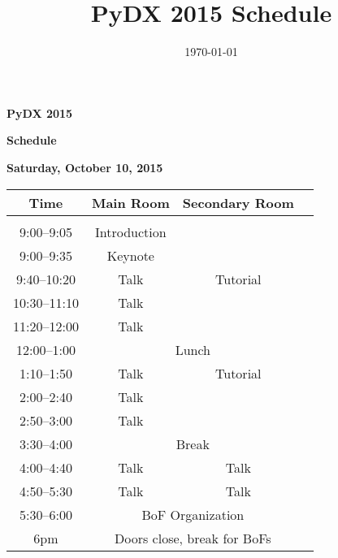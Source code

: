 \documentclass[letterpaper]{article}
\title{PyDX 2015 Schedule}
\date{\today}
\def\vsep{9pt}
\begin{document}
\Large

\centerline{\LARGE\bf PyDX 2015}
\vskip 10pt
\centerline{\LARGE\bf Schedule}

\vskip 1in

\begin{center}
\textbf{Saturday, October 10, 2015}\vskip0.25in
\begin{tabular}{cccc}
  \toprule
  Time & Main Room & Secondary Room \\
  \midrule\\[0pt]
  9:00--9:05 & Introduction & \\[\vsep]
  9:00--9:35 & Keynote & \\[\vsep]
  \midrule
  9:40--10:20 & Talk & Tutorial \\[\vsep]
  10:30--11:10 & Talk & \\[\vsep]
  11:20--12:00 & Talk & \\[\vsep]
  \midrule
  12:00--1:00 & \multicolumn{2}{c}{Lunch} \\[\vsep]
  \midrule
  1:10--1:50 & Talk & Tutorial \\[\vsep]
  2:00--2:40 & Talk &  \\[\vsep]
  2:50--3:00 & Talk &  \\[\vsep]
  \midrule
  3:30--4:00 & \multicolumn{2}{c}{Break} \\[\vsep]
  \midrule
  4:00--4:40 & Talk & Talk \\[\vsep]
  4:50--5:30 & Talk & Talk \\[\vsep]
  \midrule
  5:30--6:00 & \multicolumn{2}{c}{BoF Organization} \\[\vsep]
  6pm  & \multicolumn{2}{c}{Doors close, break for BoFs} \\[\vsep]
  \bottomrule
\end{tabular}
\end{center}
\end{document}
